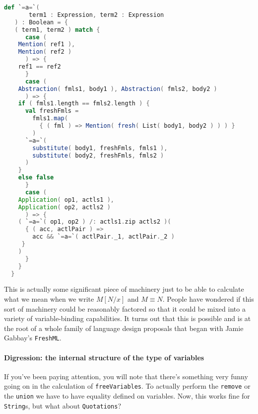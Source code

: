\begin{lstlisting}[language=Scala]  
  def `=a=`(
       term1 : Expression, term2 : Expression
   ) : Boolean = {
   ( term1, term2 ) match {
      case (
	Mention( ref1 ),
	Mention( ref2 )
      ) => {
	ref1 == ref2
      }
      case (
	Abstraction( fmls1, body1 ), Abstraction( fmls2, body2 )
      ) => {
	if ( fmls1.length == fmls2.length ) {
	  val freshFmls =
	    fmls1.map(
	      { ( fml ) => Mention( fresh( List( body1, body2 ) ) ) }
	    )
	  `=a=`(
	    substitute( body1, freshFmls, fmls1 ),
	    substitute( body2, freshFmls, fmls2 )
	  )
	}
	else false
      }      
      case (
	Application( op1, actls1 ),
	Application( op2, actls2 )
      ) => {
	( `=a=`( op1, op2 ) /: actls1.zip actls2 )(
	  { ( acc, actlPair ) =>
	    acc && `=a=`( actlPair._1, actlPair._2 )
	 }
	)
      }
    }
  }
\end{lstlisting}

This is actually some significant piece of machinery just to be able
to calculate what we mean when we write $M[N/x]$ and $M \equiv N$.
People have wondered if this sort of machinery could be reasonably
factored so that it could be mixed into a variety of variable-binding
capabilities. It turns out that this is possible and is at the root of
a whole family of language design proposals that began with Jamie
Gabbay's \texttt{FreshML}.

\paragraph{Digression: the internal structure of the type of variables}
If you've been paying attention, you will note that there's something
very funny going on in the calculation of
\lstinline[language=Scala]!freeVariables!. To actually perform the
\lstinline[language=Scala]!remove! or the
\lstinline[language=Scala]!union! we have to have equality defined on
variables. Now, this works fine for
\lstinline[language=Scala]!String!s, but what about
\lstinline[language=Scala]!Quotations!?

